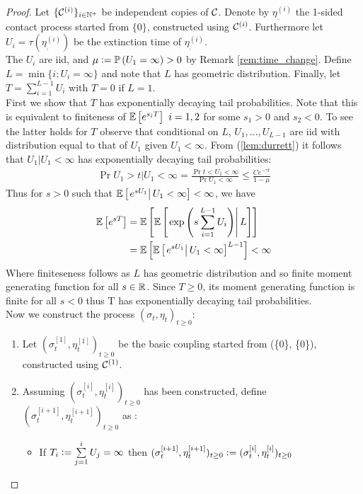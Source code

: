 \begin{proof}
Let $\{ \cal{C}^{(i)}\}_{i \in \N^+}$ be independent copies of $\cal{C}$. Denote by $\eta^{(i)}_.$ the 1-sided contact process started from $\{0\}$, constructed using $\cal{C}^{(i)}$. Furthermore let $U_i = \tau(\eta^{(i)}_.)$ be the extinction time of $\eta^{(i)}_.$. \\
The $U_i$ are iid, and $\mu \defeq \Pr{U_1 = \infty} > 0$ by Remark \ref{rem:time_change}. Define $L = \min \{ i: U_i = \infty \}$ and note that $L$ has geometric distribution. Finally, let $T = \sum\limits^{L-1}_{i=1} U_i$ with $T=0$ if $L=1$. \\
First we show that $T$ has exponentially decaying tail probabilities. Note that this is equivalent to finiteness of $\Ex{e^{s_i T}}\ i=1,2$ for some $s_1 > 0$ and $s_2 < 0$. To see the latter holds for $T$ observe that conditional on $L$, $U_1, ..., U_{L-1}$ are iid with distribution equal to that of $U_1$ given $U_1 < \infty$. From (\ref{lem:durrett}) it follows that $U_1 | U_1 < \infty$ has exponentially decaying tail probabilities:
\begin{align*}
\Pr{U_1 > t | U_1 < \infty} = \frac{\Pr{t < U_1 < \infty}}{\Pr{U_1 < \infty}} \leq \frac{C e^{- \gamma t}}{1 - \mu}
\end{align*}
Thus for $s > 0$ such that $\ExCond{e^{sU_1}}{U_1 < \infty} < \infty$, we have
\begin{align*}
\Ex{e^{sT}} &= \Ex{\ExCond{\exp\left(s\sum\limits_{i=1}^{L-1} U_i \right)}{L}} \\
            &= \Ex{\ExCond{e^{s U_1}}{U_1 < \infty}^{L-1}} < \infty \\
\end{align*}
Where finiteseness follows as $L$ has geometric distribution and so finite moment generating function for all $s \in \R$. Since $T \geq 0$, its moment generating function is finite for all $s < 0$ thus T has exponentially decaying tail probabilities. \\
Now we construct the process $(\sigma_t, \eta_t)_{t \geq 0}$:
\begin{enumerate}
  \item Let $(\sigma^{[1]}_t, \eta^{[1]}_t)_{t \geq 0}$ be the basic coupling started from (\{0\}, \{0\}), constructed using $\cal{C}^{(1)}$. 
  \item Assuming $(\sigma^{[i]}_t, \eta^{[i]}_t)_{t \geq 0}$ has been constructed, define $(\sigma^{[i+1]}_t, \eta^{[i+1]}_t)_{t \geq 0}$ as :
  \begin{itemize}
    \item If $T_i \defeq \sum\limits^i_{j=1} U_j = \infty$ then $(\sigma^{[i+1]}_t, \eta^{[i+1]}_t)_{t \geq 0} \defeq (\sigma^{[i]}_t, \eta^{[i]}_t)_{t \geq 0}$

\end{itemize}
\end{enumerate}
\end{proof}
